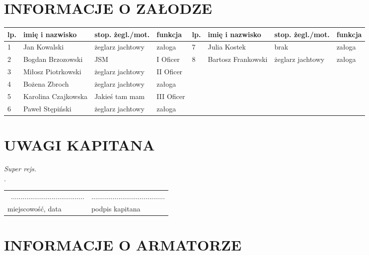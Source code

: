 \documentclass{article}
\begin{document}
\section*{INFORMACJE O ZAŁODZE}
    \begin{tabular}{|m{}|m{}|m{}|m{}||m{}|m{}|m{}|m{}|}
    \hline
    lp. & imię i nazwisko & stop. żegl./mot. & funkcja & lp. & imię i nazwisko &stop. żegl./mot. & funkcja\\
    \hline
    
1 & Jan Kowalski & żeglarz jachtowy & załoga &7 & Julia Kostek & brak & załoga\\
\hline
2 & Bogdan Brzozowski & JSM & I Oficer &8 & Bartosz Frankowski & żeglarz jachtowy & załoga\\
\hline
3 & Miłosz Piotrkowski & żeglarz jachtowy & II Oficer &&&&\\
\hline
4 & Bożena Zbroch & żeglarz jachtowy & załoga &&&&\\
\hline
5 & Karolina Czajkowska & Jakieś tam mam & III Oficer &&&&\\
\hline
6 & Paweł Stępiński & żeglarz jachtowy & załoga &&&&\\
\hline

    \end{tabular}
    
    
\section*{UWAGI KAPITANA}


\textit{Super rejs.}\dotfill \\
.\dotfill \\
\begin{tabularx}{\textwidth}{X X}
\\\
...................................... & ......................................\\
miejscowość, data & podpis kapitana\\
\end{tabularx}
\section*{INFORMACJE O ARMATORZE}
\end{document}
